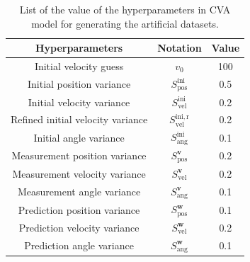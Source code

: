 \begin{table}[htb] 
    \centering
    \caption{List of the value of the hyperparameters in CVA model for generating the artificial datasets.} 
    \begin{tabular}{ccc} 
    \toprule 
    Hyperparameters&Notation& Value\\ 
    \midrule 
    Initial velocity guess              &$v_{0}$&100\\
    Initial position variance           &$S_{\mathrm{pos}}^{\mathrm{ini}}$&0.5\\
    Initial velocity variance           &$S_{\mathrm{vel}}^{\mathrm{ini}}$&0.2\\
    Refined initial velocity variance   &$S_{\mathrm{vel}}^{\mathrm{ini, r}}$&0.2\\
    Initial angle variance              &$S_{\mathrm{ang}}^{\mathrm{ini}}$&0.1\\
    Measurement position variance       &$S_{\mathrm{pos}}^{\boldsymbol{v}}$&0.2\\
    Measurement velocity variance       &$S_{\mathrm{vel}}^{\boldsymbol{v}}$&0.2\\
    Measurement angle variance          &$S_{\mathrm{ang}}^{\boldsymbol{v}}$&0.1\\
    Prediction position variance        &$S_{\mathrm{pos}}^{\boldsymbol{w}}$&0.1\\
    Prediction velocity variance        &$S_{\mathrm{vel}}^{\boldsymbol{w}}$&0.2\\
    Prediction angle variance           &$S_{\mathrm{ang}}^{\boldsymbol{w}}$&0.1\\
    \bottomrule 
    \end{tabular} 
    \label{defaultCVAvali}
\end{table}

